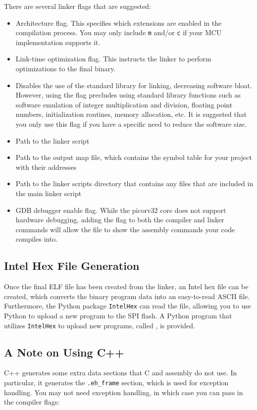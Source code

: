 \documentclass[11pt,pdftex,portrait,letterpaper]{article}
\begin{document}
There are several linker flags that are suggested:
\begin{itemize}
\item {} Architecture flag. This specifies which extensions are enabled in the compilation process. You may only include \texttt{m} and/or \texttt{c} if your MCU implementation supports it.
\item {} Link-time optimization flag. This instructs the linker to perform optimizations to the final binary.
\item {} Disables the use of the standard library for linking, decreasing software bloat. However, using the flag precludes using standard library functions such as software emulation of integer multiplication and division, floating point numbers, initialization routines, memory allocation, etc. It is suggested that you only use this flag if you have a specific need to reduce the software size.
\item {} Path to the linker script
\item {} Path to the output map file, which contains the symbol table for your project with their addresses
\item {} Path to the linker scripts directory that contains any files that are included in the main linker script
\item {} GDB debugger enable flag. While the picorv32 core does not support hardware debugging, adding the  flag to both the compiler and linker commands will allow the  file to show the assembly commands your code compiles into.
\end{itemize}


\subsection{Intel Hex File Generation}
Once the final ELF file has been created from the linker, an Intel hex file can be created, which converts the binary program data into an easy-to-read ASCII file. Furthermore, the Python package \texttt{IntelHex} can read the file, allowing you to use Python to upload a new program to the SPI flash. A Python program that utilizes \texttt{IntelHex} to upload new programs, called , is provided.


\subsection{A Note on Using C++}
C++ generates some extra data sections that C and assembly do not use. In particular, it generates the \texttt{.eh\_frame} section, which is used for exception handling. You may not need exception handling, in which case you can pass in the compiler flags:
\end{document}
